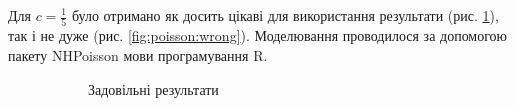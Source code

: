 Для $c = \frac{1}{5}$ було отримано як досить цікаві для використання результати
(рис. \ref{fig:poisson:strange}), так і не дуже (рис. \ref{fig:poisson:wrong}).
Моделювання проводилося за допомогою пакету NHPoisson мови програмування R.
\begin{figure}[h]
  \centering
  \begin{subfigure}[b]{0.4\textwidth}
    \caption{Задовільні результати}
    \label{fig:poisson:strange}
  \end{subfigure}
  \begin{subfigure}[b]{0.4\textwidth}

\end{subfigure}
\end{figure}
